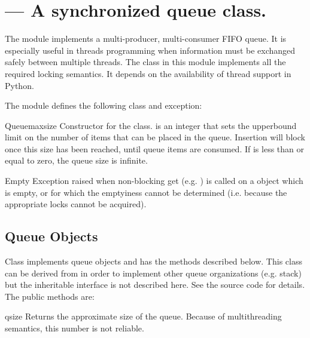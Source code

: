 \section{ ---
         A synchronized queue class.}




The  module implements a multi-producer, multi-consumer
FIFO queue.  It is especially useful in threads programming when
information must be exchanged safely between multiple threads.  The
 class in this module implements all the required locking
semantics.  It depends on the availability of thread support in
Python.

The  module defines the following class and exception:


\begin{classdesc}{Queue}{maxsize}
Constructor for the class.   is an integer that sets the
upperbound limit on the number of items that can be placed in the
queue.  Insertion will block once this size has been reached, until
queue items are consumed.  If  is less than or equal to
zero, the queue size is infinite.
\end{classdesc}

\begin{excdesc}{Empty}
Exception raised when non-blocking get (e.g. ) is
called on a  object which is empty, or for which the
emptyiness cannot be determined (i.e. because the appropriate locks
cannot be acquired).
\end{excdesc}

\subsection{Queue Objects}
\label{QueueObjects}

Class  implements queue objects and has the methods
described below.  This class can be derived from in order to implement
other queue organizations (e.g. stack) but the inheritable interface
is not described here.  See the source code for details.  The public
methods are:

\begin{methoddesc}{qsize}{}
Returns the approximate size of the queue.  Because of multithreading
semantics, this number is not reliable.
\end{methoddesc}

